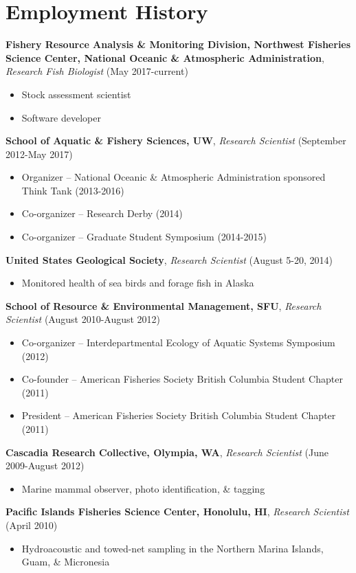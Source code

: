 \documentclass[10pt]{article}
\begin{document}
\section*{Employment History}
\textbf{Fishery Resource Analysis \& Monitoring Division, Northwest Fisheries Science Center, National Oceanic \& Atmospheric Administration}, \textit{Research Fish Biologist} (May 2017-current)
\begin{itemize}
\vspace{-2.5mm}
  \item Stock assessment scientist
  \item Software developer
\end{itemize}
\textbf{School of Aquatic \& Fishery Sciences, UW}, \textit{Research Scientist} (September 2012-May 2017)
\begin{itemize}
\vspace{-2.5mm}
\item Organizer -- National Oceanic \& Atmospheric Administration sponsored Think Tank (2013-2016)
\item Co-organizer -- Research Derby (2014)
\item Co-organizer -- Graduate Student Symposium (2014-2015)
\end{itemize}
\textbf{United States Geological Society}, \textit{Research Scientist} (August 5-20, 2014)
\begin{itemize}
\vspace{-2.5mm}
\item Monitored health of sea birds and forage fish in Alaska
\end{itemize}
\textbf{School of Resource \& Environmental Management, SFU}, \textit{Research Scientist} (August 2010-August 2012)
\begin{itemize}
\vspace{-2.5mm}
\item Co-organizer -- Interdepartmental Ecology of Aquatic Systems Symposium (2012)
\item Co-founder -- American Fisheries Society British Columbia Student Chapter (2011)
\item President -- American Fisheries Society British Columbia Student Chapter (2011)
\end{itemize}
\textbf{Cascadia Research Collective, Olympia, WA}, \textit{Research Scientist} (June 2009-August 2012)
\begin{itemize}
\vspace{-2.5mm}
\item Marine mammal observer, photo identification, \& tagging
\end{itemize}
\textbf{Pacific Islands Fisheries Science Center, Honolulu, HI}, \textit{Research Scientist} (April 2010)
\begin{itemize}
\vspace{-2.5mm}
\item Hydroacoustic and towed-net sampling in the Northern Marina Islands, Guam, \& Micronesia
\end{itemize}
\end{document}
